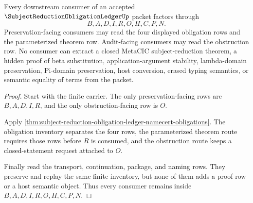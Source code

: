 \begin{theorem}
\label{thm:subject-reduction-obligation-ledger-nonescape}
Every downstream consumer of an accepted $\SubjectReductionObligationLedgerUp$ packet factors through
$$
B,A,D,I,R,O,H,C,P,N.
$$
Preservation-facing consumers may read the four displayed obligation rows and the parameterized theorem row. Audit-facing consumers may read the obstruction row. No consumer can extract a closed MetaCIC subject-reduction theorem, a hidden proof of beta substitution, application-argument stability, lambda-domain preservation, Pi-domain preservation, host conversion, erased typing semantics, or semantic equality of terms from the packet.
\end{theorem}
\begin{proof}
Start with the finite carrier. The only preservation-facing rows are $B,A,D,I,R$, and the only obstruction-facing row is $O$.

Apply \autoref{thm:subject-reduction-obligation-ledger-namecert-obligations}. The obligation inventory separates the four rows, the parameterized theorem route requires those rows before $R$ is consumed, and the obstruction route keeps a closed-statement request attached to $O$.

Finally read the transport, continuation, package, and naming rows. They preserve and replay the same finite inventory, but none of them adds a proof row or a host semantic object. Thus every consumer remains inside $B,A,D,I,R,O,H,C,P,N$.
\end{proof}


\begin{closurestatus}{\SubjectReductionObligationLedgerUp}
  \theoryclosure{\seedClosure}
  \formalstatus{\unformalizedV}
\end{closurestatus}
